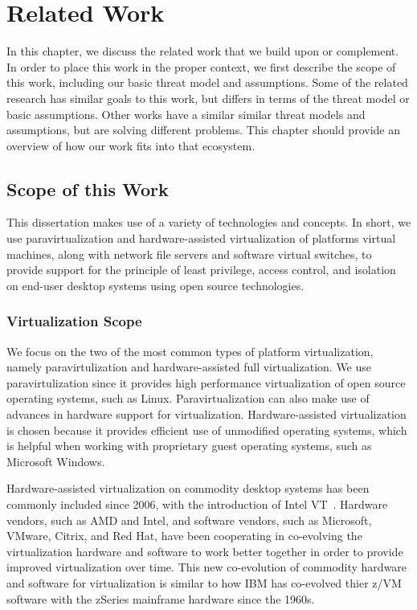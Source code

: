
\chapter{Related Work}

In this chapter, we discuss the related work that we build upon or complement. In order to place this work in the proper context, we first describe the scope of this work, including our basic threat model and assumptions. Some of the related research has similar goals to this work, but differs in terms of the threat model or basic assumptions. Other works have a similar similar threat models and assumptions, but are solving different problems. This chapter should provide an overview of how our work fits into that ecosystem.

\section{Scope of this Work}

This dissertation makes use of a variety of technologies and concepts. In short, we use paravirtualization and hardware-assisted virtualization of platforms virtual machines, along with network file servers and software virtual switches, to provide support for the principle of least privilege, access control, and isolation on end-user desktop systems using open source technologies.

\subsection{Virtualization Scope}

We focus on the two of the most common types of platform virtualization, namely paravirtulization and hardware-assisted full virtualization. We use paravirtulization since it provides high performance virtualization of open source operating systems, such as Linux. Paravirtualization can also make use of advances in hardware support for virtualization. Hardware-assisted virtualization is chosen because it provides efficient use of unmodified operating systems, which is helpful when working with proprietary guest operating systems, such as Microsoft Windows.

Hardware-assisted virtualization on commodity desktop systems has been commonly included since 2006, with the introduction of Intel VT~\cite{van_Doorn_2006}. Hardware vendors, such as AMD and Intel, and software vendors, such as Microsoft, VMware, Citrix, and Red Hat, have been cooperating in co-evolving the virtualization hardware and software to work better together in order to provide improved virtualization over time. This new co-evolution of commodity hardware and software for virtualization is similar to how IBM has co-evolved thier z/VM software with the zSeries mainframe hardware since the 1960s.

